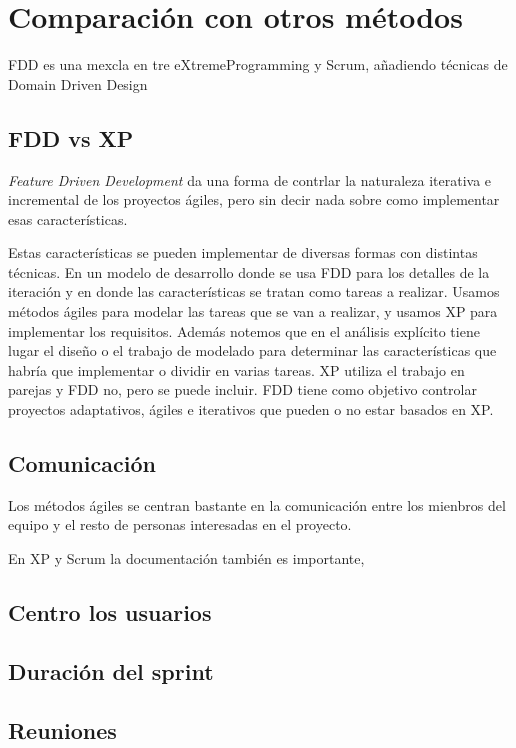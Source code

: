 \documentclass[11pt]{article}
\begin{document}
\section{Comparación con otros métodos}
FDD es una mexcla en tre eXtremeProgramming y Scrum, añadiendo técnicas de Domain Driven Design

\subsection*{FDD vs XP}
\textit{Feature Driven Development} da una forma de contrlar la naturaleza iterativa e incremental de los proyectos ágiles, pero sin decir nada sobre como implementar esas características.

Estas características se pueden implementar de diversas formas con distintas técnicas.
En un modelo de desarrollo donde se usa FDD para los detalles de la iteración y en donde las características se tratan como tareas a realizar.
Usamos métodos ágiles para modelar las tareas que se van a realizar, y usamos XP para implementar los requisitos. Además notemos que en el análisis explícito tiene lugar el diseño o el trabajo de modelado para determinar las características que habría que implementar o dividir en varias tareas. 
XP utiliza el trabajo en parejas y FDD no, pero se puede incluir. 
FDD tiene como objetivo controlar
proyectos adaptativos, ágiles e iterativos que pueden o no estar basados en XP.

\subsection*{Comunicación}
Los métodos ágiles se centran bastante en la comunicación entre los mienbros del equipo y el resto de personas interesadas en el proyecto.

En XP y Scrum la documentación también es importante, 
\subsection*{Centro los usuarios}
\subsection*{Duración del sprint}
\subsection*{Reuniones}
\end{document}
